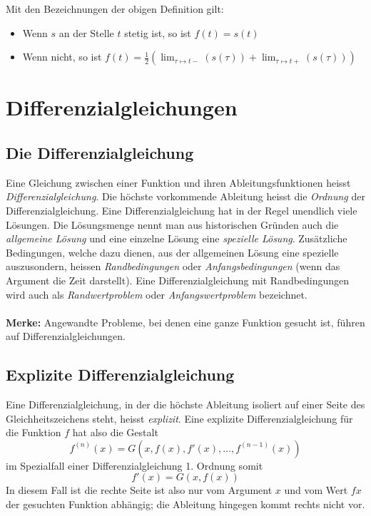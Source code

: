 \documentclass[10pt,a4paper]{scrartcl}
\begin{document}
Mit den Bezeichnungen der obigen Definition gilt:
\begin{itemize}
\item Wenn $s$ an der Stelle $t$ stetig ist, so ist $f(t) = s(t)$
\item Wenn nicht, so ist $\displaystyle f(t) = \frac{1}{2} \left(\lim_{\tau \mapsto t-}(s(\tau)) + \lim_{\tau \mapsto t+}(s(\tau))\right)$
\end{itemize}




\section{Differenzialgleichungen}

\subsection{Die Differenzialgleichung}

Eine Gleichung zwischen einer Funktion und ihren Ableitungsfunktionen heisst \textit{Differenzialgleichung}.
Die höchste vorkommende Ableitung heisst die \textit{Ordnung} der Differenzialgleichung. Eine
Differenzialgleichung hat in der Regel unendlich viele Lösungen. Die Lösungsmenge nennt man aus
historischen Gründen auch die \textit{allgemeine Lösung} und eine einzelne Lösung eine \textit{spezielle Lösung}.
Zusätzliche Bedingungen, welche dazu dienen, aus der allgemeinen Lösung eine spezielle auszusondern,
heissen \textit{Randbedingungen} oder \textit{Anfangsbedingungen} (wenn das Argument die Zeit darstellt).
Eine Differenzialgleichung mit Randbedingungen wird auch als \textit{Randwertproblem} oder \textit{Anfangswertproblem}
bezeichnet.\\\\
\textbf{Merke:} Angewandte Probleme, bei denen eine ganze Funktion gesucht ist, führen auf Differenzialgleichungen.


\subsection{Explizite Differenzialgleichung}

Eine Differenzialgleichung, in der die höchste Ableitung isoliert auf einer Seite des
Gleichheitszeichens steht, heisst \textit{explizit}. Eine explizite Differenzialgleichung
für die Funktion $f$ hat also die Gestalt
$$f^{(n)}(x) = G\left(x,f(x),f'(x),\dots,f^{(n-1)}(x)\right)$$
im Spezialfall einer Differenzialgleichung 1. Ordnung somit
$$f'(x) = G(x,f(x))$$
In diesem Fall ist die rechte Seite ist also nur vom Argument $x$ und vom Wert $fx$ der
gesuchten Funktion abhängig; die Ableitung hingegen kommt rechts nicht vor.
\end{document}
